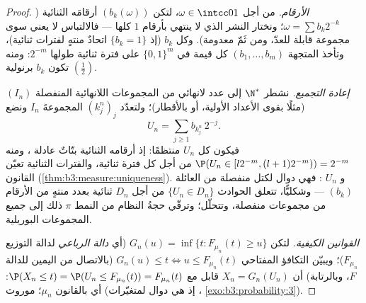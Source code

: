 \begin{proof}
\emph{الأرقام.} من أجل $\omega \in \intcc01$، لتكن $(b_k(\omega))$ أرقامَه
الثنائية ($\omega = \sum b_k2^{-k}$؛ ونختار النشر الذي لا ينتهي بأرقام $1$ كلها
--- فالالتباس لا يعني سوى مجموعة قابلة للعدّ، ومن ثَمّ معدومة).
وكل $b_k$  (إذ $\{b_k = 1\}$ اتحادٌ منتهٍ لفترات
ثنائية)، وتأخذ المتجهة $(b_1, \dots, b_m)$ كل قيمة في $\{0,1\}^m$ على فترة
ثنائية طولها $2^{-m}$: ومنه تكون $b_k$  برنولية $(\frac12)$.

\emph{إعادة التجميع.} نشطر $\N^*$ إلى عدد لانهائي من المجموعات
اللانهائية المنفصلة $(I_n)$ (مثلًا بقوى الأعداد الأولية، أو
بالأقطار)؛ ولتعدّد $(k^n_j)_j$ المجموعةَ $I_n$ ونضع
\[
U_n = \sum_{j\geq1} b_{k^n_j}\,2^{-j} .
\]
فيكون كل $U_n$ منتظمًا: إذ أرقامه الثنائية بتّاتٌ عادلة ،
ومنه $\P(U_n \in [l2^{-m}, (l+1)2^{-m})) = 2^{-m}$ من أجل كل فترة ثنائية، والفترات الثنائية تعيّن
القانون (\cref{thm:b3:measure:uniqueness}). و $U_n$ : فهي دوال لكتل منفصلة من
العائلة  $(b_k)$ --- وشكليًّا، تتعلق الحوادث $\{U_n \in D_n\}$ من
أجل $D_n$ ثنائية بعدد منتهٍ من الأرقام من مجموعات منفصلة،
وتتحلّل؛ وترقّي حجةُ النظام من النمط $\pi$ ذلك إلى جميع
المجموعات البوريلية.

\emph{القوانين الكيفية.} لتكن $G_n(u) = \inf\{t : F_{\mu_n}(t)
\geq u\}$ (أي \emph{دالة الرباعي}
لدالة التوزيع $F_{\mu_n}$)؛ ويبيّن التكافؤ المفتاحي $G_n(u) \leq t
\iff u \leq F_{\mu_n}(t)$
(بالاتصال من اليمين للدالة $F$، وبالرتابة) أن $X_n = G_n(U_n)$
قابل  مع $\P(X_n \leq t) = \P(U_n \leq F_{\mu_n}(t)) =
F_{\mu_n}(t)$: أي بالقانون $\mu_n$؛  موروث
(إذ هي دوال لمتغيّرات ، \cref{exo:b3:probability:3}).
\end{proof}

